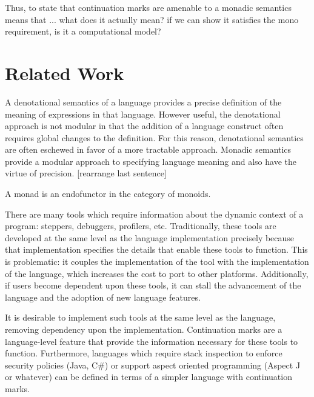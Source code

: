 \documentclass[ms]{byuprop}
\begin{document}
Thus, to state that continuation marks are amenable to a monadic semantics means that ... what does it actually mean? if we can show it satisfies the mono requirement, is it a computational model?

\section{Related Work}

A denotational semantics of a language provides a precise definition of the meaning of expressions in that language. However useful, the denotational approach is not modular in that the addition of a language construct often requires global changes to the definition. For this reason, denotational semantics are often eschewed in favor of a more tractable approach. Monadic semantics provide a modular approach to specifying language meaning and also have the virtue of precision. [rearrange last sentence]


A monad is an endofunctor in the category of monoids.


There are many tools which require information about the dynamic context of a program: steppers, debuggers, profilers, etc. Traditionally, these tools are developed at the same level as the language implementation precisely because that implementation specifies the details that enable these tools to function. This is problematic: it couples the implementation of the tool with the implementation of the language, which increases the cost to port to other platforms. Additionally, if users become dependent upon these tools, it can stall the advancement of the language and the adoption of new language features.

It is desirable to implement such tools at the same level as the language, removing dependency upon the implementation. Continuation marks are a language-level feature that provide the information necessary for these tools to function. Furthermore, languages which require stack inspection to enforce security policies (Java, C#) or support aspect oriented programming (Aspect J or whatever) can be defined in terms of a simpler language with continuation marks.

\end{document}
